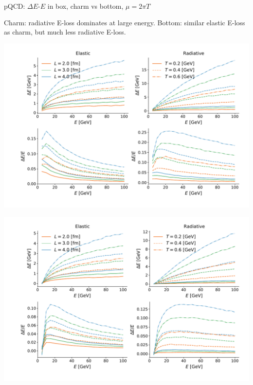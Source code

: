 \documentclass[11pt]{beamer}
\begin{document}
\begin{frame}{pQCD: $\Delta E$-$E$ in box, charm vs bottom, $\mu = 2\pi T$}
\begin{overprint}
Charm: radiative E-loss dominates at large energy.
Bottom: similar elastic E-loss as charm, but much less radiative E-loss.
\end{overprint}
\begin{overprint}
\begin{center}
\includegraphics[width=\textwidth]{fig/charm-plot/E_Eloss.pdf}
\end{center}
\begin{center}
\includegraphics[width=\textwidth]{fig/bottom-plot/E_Eloss.pdf}
\end{center}
\end{overprint}
\end{frame}
\end{document}
